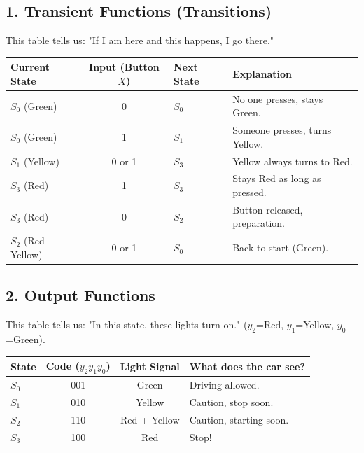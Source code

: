 \documentclass[12pt,a4paper]{article}
\begin{document}
\subsection{1. Transient Functions (Transitions)}
This table tells us: "If I am here and this happens, I go there."

\begin{table}[h]
\centering
\begin{tabular}{lcll}
\toprule
Current State & Input (Button $X$) & Next State & Explanation \\
\midrule
$S_0$ (Green) & 0 & $S_0$ & No one presses, stays Green. \\
$S_0$ (Green) & 1 & $S_1$ & Someone presses, turns Yellow. \\
$S_1$ (Yellow) & 0 or 1 & $S_3$ & Yellow always turns to Red. \\
$S_3$ (Red) & 1 & $S_3$ & Stays Red as long as pressed. \\
$S_3$ (Red) & 0 & $S_2$ & Button released, preparation. \\
$S_2$ (Red-Yellow) & 0 or 1 & $S_0$ & Back to start (Green). \\
\bottomrule
\end{tabular}
\end{table}

\subsection{2. Output Functions}
This table tells us: "In this state, these lights turn on." ($y_2$=Red, $y_1$=Yellow, $y_0$=Green).

\begin{table}[h]
\centering
\begin{tabular}{lccl}
\toprule
State & Code ($y_2 y_1 y_0$) & Light Signal & What does the car see? \\
\midrule
$S_0$ & 001 & Green & Driving allowed. \\
$S_1$ & 010 & Yellow & Caution, stop soon. \\
$S_2$ & 110 & Red + Yellow & Caution, starting soon. \\
$S_3$ & 100 & Red & Stop! \\
\bottomrule
\end{tabular}
\end{table}
\end{document}
